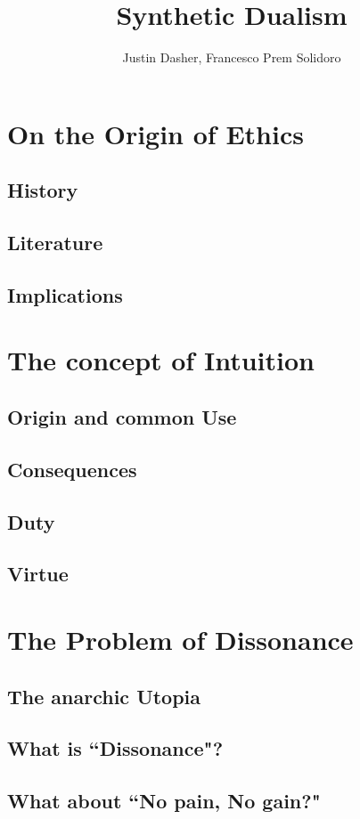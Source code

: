 \documentclass[12pt]{article}
\title{Synthetic Dualism}
\author{Justin Dasher, Francesco Prem Solidoro}
\begin{document}
\maketitle
\section{On the Origin of Ethics}
\subsection{History}
\subsection{Literature}
\subsection{Implications}
\section{The concept of Intuition}
\subsection{Origin and common Use}
\subsection{Consequences}
\subsection{Duty}
\subsection{Virtue}
\section{The Problem of Dissonance}
\subsection{The anarchic Utopia}
\subsection{What is ``Dissonance"?}
\subsection{What about ``No pain, No gain?"}
\end{document}
